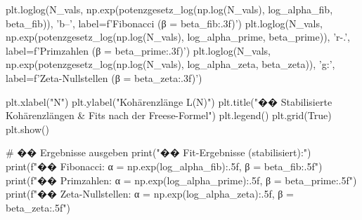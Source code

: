 plt.loglog(N_vals, np.exp(potenzgesetz_log(np.log(N_vals), log_alpha_fib, beta_fib)), 'b--', label=f'Fibonacci (β = {beta_fib:.3f})')
plt.loglog(N_vals, np.exp(potenzgesetz_log(np.log(N_vals), log_alpha_prime, beta_prime)), 'r-.', label=f'Primzahlen (β = {beta_prime:.3f})')
plt.loglog(N_vals, np.exp(potenzgesetz_log(np.log(N_vals), log_alpha_zeta, beta_zeta)), 'g:', label=f'Zeta-Nullstellen (β = {beta_zeta:.3f})')

plt.xlabel("N")
plt.ylabel("Kohärenzlänge L(N)")
plt.title("�� Stabilisierte Kohärenzlängen & Fits nach der Freese-Formel")
plt.legend()
plt.grid(True)
plt.show()

# �� Ergebnisse ausgeben
print("\n�� Fit-Ergebnisse (stabilisiert):")
print(f"�� Fibonacci: α = {np.exp(log_alpha_fib):.5f}, β = {beta_fib:.5f}")
print(f"�� Primzahlen: α = {np.exp(log_alpha_prime):.5f}, β = {beta_prime:.5f}")
print(f"�� Zeta-Nullstellen: α = {np.exp(log_alpha_zeta):.5f}, β = {beta_zeta:.5f}")